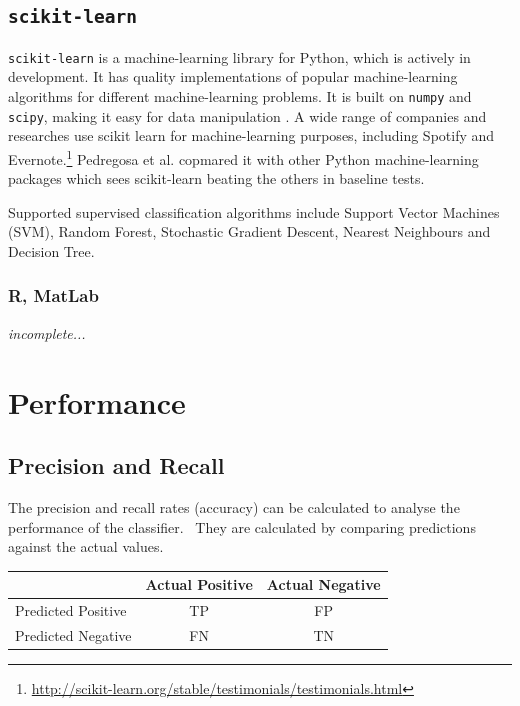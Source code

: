 \documentclass[11pt,openright,a4paper]{report}
\begin{document}
\subsection{\texttt{scikit-learn}}
\texttt{scikit-learn} is a machine-learning library for Python, which is actively in development. It has quality implementations of popular machine-learning algorithms for different machine-learning problems. It is built on \texttt{numpy} and \texttt{scipy}, making it easy for data manipulation \cite{scikit-learn-paper}. A wide range of companies and researches use scikit learn for machine-learning purposes, including Spotify and Evernote.\footnote{\url{http://scikit-learn.org/stable/testimonials/testimonials.html}} Pedregosa et al. \cite{scikit-learn-paper} copmared it with other Python machine-learning packages which sees scikit-learn beating the others in baseline tests.

Supported supervised classification algorithms include Support Vector Machines (SVM), Random Forest, Stochastic Gradient Descent, Nearest Neighbours and Decision Tree. 

\subsubsection{R, MatLab}
\textit{incomplete...}

\section{Performance}
\subsection{Precision and Recall}
The precision and recall rates (accuracy) can be calculated to analyse the performance of the classifier.~\cite{precision-recall} They are calculated by comparing predictions against the actual values.

\parbox{\linewidth} {
  \centering
  \begin{tabular}{|l|c|c|}
    \hline
                        & Actual Positive & Actual Negative
    \\ \hline
    Predicted Positive  & TP              & FP
    \\ \hline
    Predicted Negative  & FN              & TN
    \\ \hline
  \end{tabular}

  \label{tab:cm}
}
\end{document}
